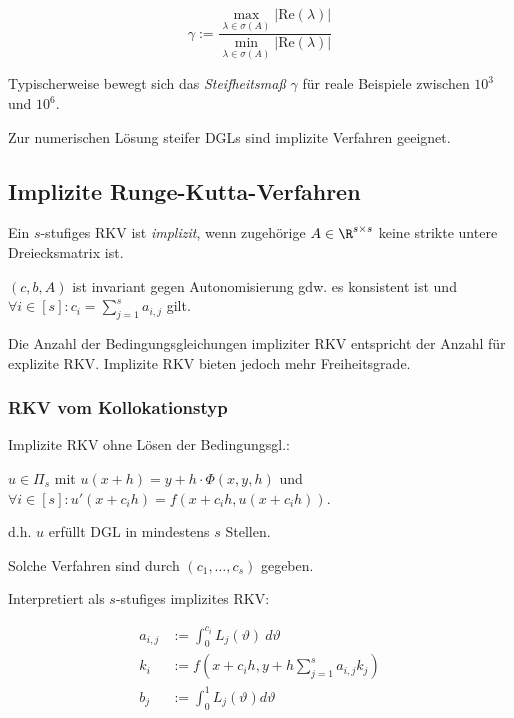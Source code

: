 \[ \gamma := \frac{\max_{\lambda \in \sigma(A)}{|\text{Re}(\lambda)|}}{\min_{\lambda \in \sigma(A)}{|\text{Re}(\lambda)|}} \]

Typischerweise bewegt sich das \emph{Steifheitsmaß} $\gamma$ für reale Beispiele zwischen ${10}^3$ und ${10}^6$.

\spacing

Zur numerischen Lösung steifer DGLs sind implizite Verfahren geeignet.

\subsection*{Implizite Runge-Kutta-Verfahren}

Ein $s$-stufiges RKV ist \emph{implizit}, wenn zugehörige $A \in \R^{s \times s}$ keine strikte untere Dreiecksmatrix ist.

\spacing

$(c,b,A)$ ist invariant gegen Autonomisierung gdw. es konsistent ist und $\forall i \in [s] : c_i = \sum_{j=1}^s a_{i,j}$ gilt.

\spacing

Die Anzahl der Bedingungsgleichungen impliziter RKV entspricht der Anzahl für explizite RKV. Implizite RKV bieten jedoch mehr Freiheitsgrade.

\subsubsection*{RKV vom Kollokationstyp}

Implizite RKV ohne Lösen der Bedingungsgl.:

\spacing

$u \in \Pi_s$ mit $u(x+h) = y+h\cdot\Phi(x,y,h)$ und $\forall i \in [s] : u'(x+c_i h) = f(x+c_i h,u(x+c_i h))$.

\spacing

d.h. $u$ erfüllt DGL in mindestens $s$ Stellen.

Solche Verfahren sind durch $(c_1,\dots,c_s)$ gegeben.

Interpretiert als $s$-stufiges implizites RKV:

\vspace*{-4mm}
\begin{align*}
a_{i,j} &:= \int_0^{c_i} L_j(\vartheta) \ d\vartheta \\
k_i &:= f(x+c_ih,y+h\sum_{j=1}^s a_{i,j} k_j) \\
b_j &:= \int_0^1 L_j(\vartheta) d\vartheta
\end{align*}

